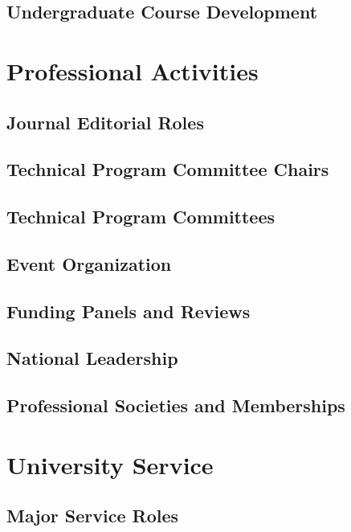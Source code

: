 \documentclass[letter,10pt]{article}
\begin{document}
\subsection{Undergraduate Course Development}



\section{Professional Activities}
\subsection{Journal Editorial Roles}

\subsection{Technical Program Committee Chairs}

\subsection{Technical Program Committees}

\subsection{Event Organization}


\subsection{Funding Panels and Reviews}

\subsection{National Leadership}

\subsection{Professional Societies and Memberships}


\section{University Service}

\subsection{Major Service Roles}

\end{document}
